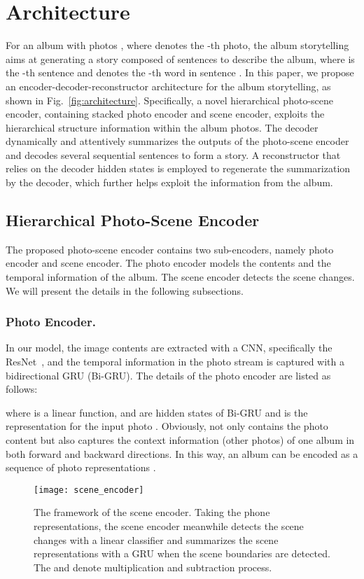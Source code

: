 \documentclass[letterpaper]{article} \usepackage{aaai19}  \usepackage{times}  \usepackage{helvet}  \usepackage{courier}  \usepackage{url}  \usepackage{graphicx}  \usepackage{color}
\begin{document}
\section{Architecture}
For an album with  photos , where  denotes the -th photo, the album storytelling aims at generating a story composed of  sentences  to describe the album, where  is the -th sentence and  denotes the -th word in sentence .
In this paper, we propose an encoder-decoder-reconstructor architecture for the album storytelling, as shown in Fig.~\ref{fig:architecture}.  Specifically, a novel hierarchical photo-scene encoder, containing stacked photo encoder and scene encoder, exploits the hierarchical structure information within the album photos. The decoder dynamically and attentively summarizes the outputs of the photo-scene encoder and decodes several sequential sentences to form a story. A reconstructor that relies on the decoder hidden states is employed to regenerate the summarization by the decoder, which further helps  exploit the information from the album.




\subsection{Hierarchical Photo-Scene Encoder}
The proposed photo-scene encoder contains two sub-encoders, namely photo encoder and scene encoder. The photo encoder models the contents and the temporal information of the album. The scene encoder detects the scene changes. We will present the details in the following subsections.

\subsubsection{Photo Encoder.}

In our model, the image contents are extracted with a CNN, specifically the ResNet~\cite{he2016deep}, and the temporal information in the photo stream is captured with a bidirectional GRU (Bi-GRU). The details of the photo encoder are listed as follows:

where  is a linear function,  and  are hidden states of Bi-GRU and  is the representation for the input photo . Obviously,  not only contains the photo content but also captures the context information (other photos) of one album in both forward and backward directions.  In this way, an album  can be encoded as a sequence of photo representations .


\begin{figure}[t]
\centering
\texttt{[image: scene\_encoder]}
\caption{The framework of the scene encoder. Taking the phone representations, the scene encoder meanwhile detects the scene changes with a linear classifier and summarizes the scene representations with a GRU when the scene boundaries are detected. The  and  denote multiplication and subtraction process.}
\label{fig:scene_encoder}
\end{figure}
\end{document}
